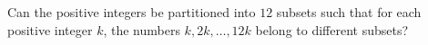 Can the positive integers be partitioned into $12$ subsets such that for each positive integer $k$,  the numbers $k, 2k,\ldots,12k$ belong to different subsets?